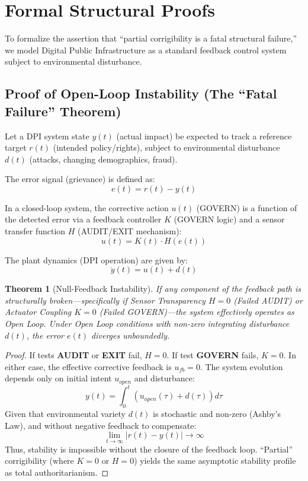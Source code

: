 \documentclass{article}
\newtheorem{theorem}{Theorem}
\begin{document}
\section{Formal Structural Proofs}
\label{appendix:proofs}

To formalize the assertion that ``partial corrigibility is a fatal structural failure,'' we model Digital Public Infrastructure as a standard feedback control system subject to environmental disturbance.

\subsection{Proof of Open-Loop Instability (The ``Fatal Failure'' Theorem)}

Let a DPI system state $y(t)$ (actual impact) be expected to track a reference target $r(t)$ (intended policy/rights), subject to environmental disturbance $d(t)$ (attacks, changing demographics, fraud).

The error signal (grievance) is defined as:
\begin{equation}
e(t) = r(t) - y(t)
\end{equation}

In a closed-loop system, the corrective action $u(t)$ (GOVERN) is a function of the detected error via a feedback controller $K$ (GOVERN logic) and a sensor transfer function $H$ (AUDIT/EXIT mechanism):
\begin{equation}
u(t) = K(t) \cdot H(e(t))
\end{equation}

The plant dynamics (DPI operation) are given by:
\begin{equation}
\dot{y}(t) = u(t) + d(t)
\end{equation}

\begin{theorem}[Null-Feedback Instability]
If any component of the feedback path is structurally broken---specifically if Sensor Transparency $H=0$ (Failed AUDIT) or Actuator Coupling $K=0$ (Failed GOVERN)---the system effectively operates as Open Loop. Under Open Loop conditions with non-zero integrating disturbance $d(t)$, the error $e(t)$ diverges unboundedly.
\end{theorem}

\begin{proof}
If tests \textbf{AUDIT} or \textbf{EXIT} fail, $H=0$.
If test \textbf{GOVERN} fails, $K=0$.
In either case, the effective corrective feedback is $u_{fb} = 0$.
The system evolution depends only on initial intent $u_{open}$ and disturbance:
\begin{equation}
y(t) = \int_0^t (u_{open}(\tau) + d(\tau)) d\tau
\end{equation}
Given that environmental variety $d(t)$ is stochastic and non-zero (Ashby's Law), and without negative feedback to compensate:
\begin{equation}
\lim_{t \to \infty} |r(t) - y(t)| \to \infty
\end{equation}
Thus, stability is impossible without the closure of the feedback loop. ``Partial'' corrigibility (where $K=0$ or $H=0$) yields the same asymptotic stability profile as total authoritarianism.
\end{proof}
\end{document}
